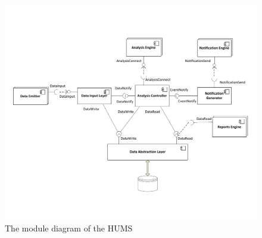 \begin{figure}[ht!]
\includegraphics[width=13cm]{images/moduleDiagram.pdf}
\caption{The module diagram of the HUMS}
\label{fig:moduleDiagram}
\end{figure}

